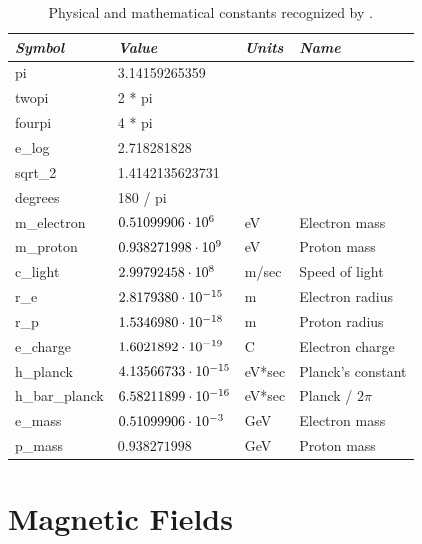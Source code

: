 \begin{table}
\centering
\begin{tabular}{|l|l|l|l|} \hline
  {\em Symbol}  & {\em Value}       & {\em Units} &  {\em Name}       \\ \hline
  pi            & 3.14159265359          &        &                   \\
  twopi         & 2 * pi                 &        &                   \\
  fourpi        & 4 * pi                 &        &                   \\
  e_log         & 2.718281828            &        &                   \\
  sqrt_2        & 1.4142135623731        &        &                   \\
  degrees       & 180 / pi               &        &                   \\
  m_electron    & $0.51099906 \cdot 10^{6}$   & eV     & Electron mass     \\
  m_proton      & $0.938271998 \cdot 10^{9}$  & eV     & Proton mass       \\
  c_light       & $2.99792458 \cdot 10^{8}$   & m/sec  & Speed of light    \\
  r_e           & $2.8179380 \cdot 10^{-15}$  & m      & Electron radius   \\
  r_p           & $1.5346980 \cdot 10^{-18}$  & m      & Proton radius     \\
  e_charge      & $1.6021892 \cdot 10^{-19}$  & C      & Electron charge   \\
  h_planck      & $4.13566733 \cdot 10^{-15}$ & eV*sec & Planck's constant \\
  h_bar_planck  & $6.58211899 \cdot 10^{-16}$ & eV*sec & Planck / $2\pi$   \\
  e_mass        & $0.51099906 \cdot 10^{-3}$  & GeV    & Electron mass     \\
  p_mass        & $0.938271998$          & GeV    & Proton mass       \\ \hline
\end{tabular}
\caption{Physical and mathematical constants recognized by \bmad.}
\label{t:constants}
\end{table}


\section{Magnetic Fields}
\label{s:fields}

